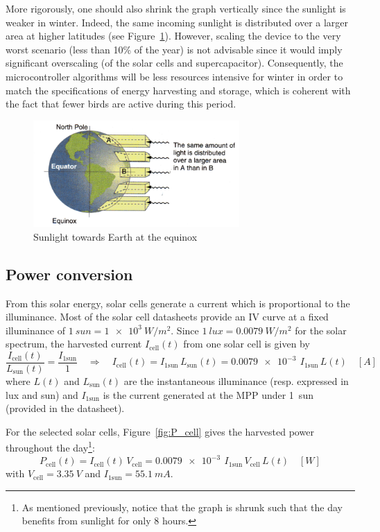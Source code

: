 \documentclass{EPL-master-thesis-covers-EN}
\newcommand{\te}[1]{\textrm{#1}}
\begin{document}
More rigorously, one should also shrink the graph vertically since the sunlight is weaker in winter. Indeed, the same incoming sunlight is distributed over a larger area at higher latitudes (see Figure~\ref{fig:sunlight_png}). However, scaling the device to the very worst scenario (less than 10\% of the year) is not advisable since it would imply significant overscaling (of the solar cells and supercapacitor). Consequently, the microcontroller algorithms will be less resources intensive for winter in order to match the specifications of energy harvesting and storage, which is coherent with the fact that fewer birds are active during this period.

\begin{figure}[H]
    \centering
    \includegraphics[width=0.7\textwidth]{img/sunlight.png}
    \caption{Sunlight towards Earth at the equinox~\cite{ackerman2007meteorology}}
    \label{fig:sunlight_png}
\end{figure}


\subsection*{Power conversion}

From this solar energy, solar cells generate a current which is proportional to the illuminance. Most of the solar cell datasheets provide an IV curve at a fixed illuminance of $\SI{1}{sun} = \SI{1e3}{W/m^2}$. Since $\SI{1}{lux} = \SI{0.0079}{W/m^2}$ for the solar spectrum, the harvested current $I_\te{cell}(t)$ from one solar cell is given by
\[
  \frac{I_\te{cell}(t)}{L_\te{sun}(t)} = \frac{I_{1\te{sun}}}{1} \quad \Rightarrow \quad I_\te{cell}(t) = I_{1\te{sun}}\,L_\te{sun}(t) = \SI{0.0079e-3}{}\,I_{1\te{sun}}\,L(t) \quad \si{[A]}
\]
where $L(t)$ and $L_{\te{sun}}(t)$ are the instantaneous illuminance (resp. expressed in lux and sun) and $I_{1\te{sun}}$ is the current generated at the MPP under \SI{1}{sun} (provided in the datasheet).

For the selected solar cells, Figure~\ref{fig:P_cell} gives the harvested power throughout the day\footnote{As mentioned previously, notice that the graph is shrunk such that the day benefits from sunlight for only 8 hours.}: 
\[
 P_\te{cell}(t) = I_\te{cell}(t)\,V_\te{cell} = \SI{0.0079e-3}{}\,I_{1\te{sun}}\,V_\te{cell}\,L(t) \quad \si{[W]}
\]
with $V_\te{cell} = \SI{3.35}{V}$ and $I_{1\te{sun}} = \SI{55.1}{mA}$.
\end{document}

